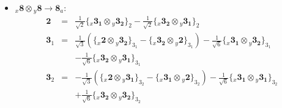 \documentclass[english]{article}
\newcommand{\rep}[1]{\mathbf{#1}}
\newcommand{\repx}[2]{{}_{#2}\mathbf{#1}}
\newcommand{\subcg}[3]{\big\{ \repx{#1}{x}\otimes\repx{#2}{y}\big\}^{}_{#3}}
\begin{document}
\begin{itemize}
\begin{eqnarray*}
\end{eqnarray*}
\item $\repx{8}{x}\otimes\repx{8}{y}\to\rep{8}_{a}$:
\begin{eqnarray*}
\rep{2} &=& \frac{1}{\sqrt{2}}\subcg{3_{1}}{3_{2}}{2}-\frac{1}{\sqrt{2}}\subcg{3_{2}}{3_{1}}{2}
\\
\rep{3}_{1} &=& \frac{1}{\sqrt{3}}\left(\subcg{2}{3_{2}}{3_{1}}-\subcg{3_{2}}{2}{3_{1}}\right)-\frac{1}{\sqrt{6}}\subcg{3_{1}}{3_{2}}{3_{1}} \\ 
 & & -\frac{1}{\sqrt{6}}\subcg{3_{2}}{3_{1}}{3_{1}}
\\
\rep{3}_{2} &=& -\frac{1}{\sqrt{3}}\left(\subcg{2}{3_{1}}{3_{2}}-\subcg{3_{1}}{2}{3_{2}}\right)-\frac{1}{\sqrt{6}}\subcg{3_{1}}{3_{1}}{3_{2}} \\ 
 & & +\frac{1}{\sqrt{6}}\subcg{3_{2}}{3_{2}}{3_{2}}
\end{eqnarray*}
\end{itemize}
\end{document}
